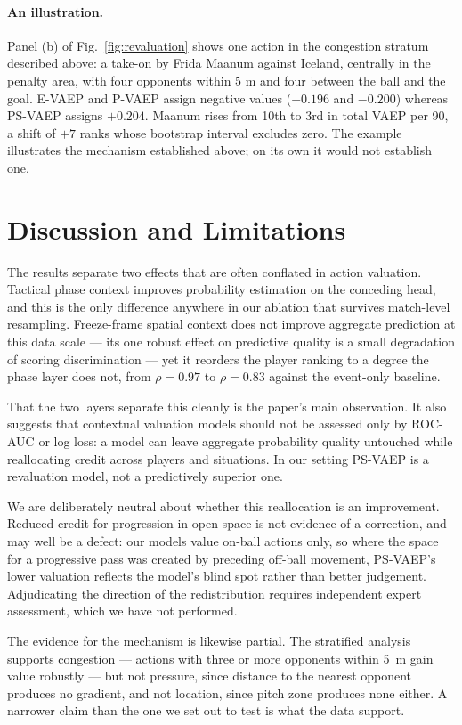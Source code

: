 \documentclass[runningheads]{llncs}
\begin{document}
\paragraph{An illustration.}
Panel (b) of Fig.~\ref{fig:revaluation} shows one action in the congestion stratum described above: a take-on by Frida Maanum against Iceland, centrally in the penalty area, with four opponents within 5 m and four between the ball and the goal. E-VAEP and P-VAEP assign negative values ($-0.196$ and $-0.200$) whereas PS-VAEP assigns $+0.204$. Maanum rises from 10th to 3rd in total VAEP per 90, a shift of $+7$ ranks whose bootstrap interval excludes zero. The example illustrates the mechanism established above; on its own it would not establish one.
\section{Discussion and Limitations}
\label{sec:limitations}
The results separate two effects that are often conflated in action valuation. Tactical phase context improves probability estimation on the conceding head, and this is the only difference anywhere in our ablation that survives match-level resampling. Freeze-frame spatial context does not improve aggregate prediction at this data scale --- its one robust effect on predictive quality is a small degradation of scoring discrimination --- yet it reorders the player ranking to a degree the phase layer does not, from $\rho = 0.97$ to $\rho = 0.83$ against the event-only baseline.

That the two layers separate this cleanly is the paper's main observation. It also suggests that contextual valuation models should not be assessed only by ROC-AUC or log loss: a model can leave aggregate probability quality untouched while reallocating credit across players and situations. In our setting PS-VAEP is a revaluation model, not a predictively superior one.

We are deliberately neutral about whether this reallocation is an improvement. Reduced credit for progression in open space is not evidence of a correction, and may well be a defect: our models value on-ball actions only, so where the space for a progressive pass was created by preceding off-ball movement, PS-VAEP's lower valuation reflects the model's blind spot rather than better judgement. Adjudicating the direction of the redistribution requires independent expert assessment, which we have not performed.

The evidence for the mechanism is likewise partial. The stratified analysis supports congestion --- actions with three or more opponents within 5~m gain value robustly --- but not pressure, since distance to the nearest opponent produces no gradient, and not location, since pitch zone produces none either. A narrower claim than the one we set out to test is what the data support.
\end{document}
